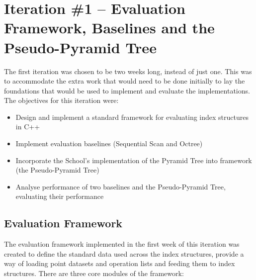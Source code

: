 \section{Iteration \#1 -- Evaluation Framework, Baselines and the Pseudo-Pyramid Tree}

The first iteration was chosen to be two weeks long, instead of just one. This was to accommodate the extra work that would need to be done initially to lay the foundations that would be used to implement and evaluate the implementations. The objectives for this iteration were:
\begin{itemize}
	\item Design and implement a standard framework for evaluating index structures in C++
	\item Implement evaluation baselines (Sequential Scan and Octree)
	\item Incorporate the School's implementation of the Pyramid Tree into framework (the Pseudo-Pyramid Tree)
	\item Analyse performance of two baselines and the Pseudo-Pyramid Tree, evaluating their performance
\end{itemize}


\subsection{Evaluation Framework}

The evaluation framework implemented in the first week of this iteration was created to define the standard data used across the index structures, provide a way of loading point datasets and operation lists and feeding them to index structures. There are three core modules of the framework:

